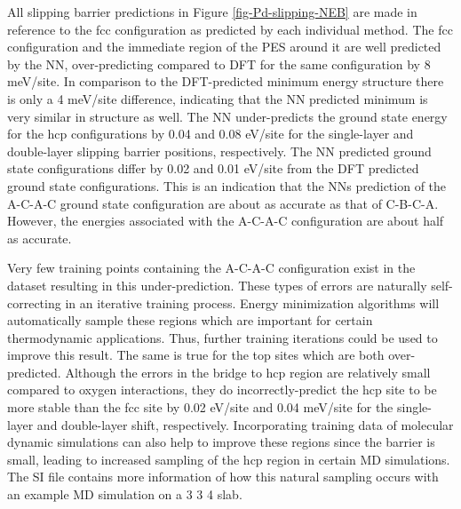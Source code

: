 \documentclass[12pt,oneside]{cmuthesis}
\begin{document}
All slipping barrier predictions in Figure \ref{fig-Pd-slipping-NEB} are made in reference to the fcc configuration as predicted by each individual method. The fcc configuration and the immediate region of the PES around it are well predicted by the NN, over-predicting compared to DFT for the same configuration by 8 meV/site. In comparison to the DFT-predicted minimum energy structure there is only a 4 meV/site difference, indicating that the NN predicted minimum is very similar in structure as well. The NN under-predicts the ground state energy for the hcp configurations by 0.04 and 0.08 eV/site for the single-layer and double-layer slipping barrier positions, respectively. The NN predicted ground state configurations differ by 0.02 and 0.01 eV/site from the DFT predicted ground state configurations. This is an indication that the NNs prediction of the A-C-A-C ground state configuration are about as accurate as that of C-B-C-A. However, the energies associated with the A-C-A-C configuration are about half as accurate.

Very few training points containing the A-C-A-C configuration exist in the dataset resulting in this under-prediction. These types of errors are naturally self-correcting in an iterative training process. Energy minimization algorithms will automatically sample these regions which are important for certain thermodynamic applications. Thus, further training iterations could be used to improve this result. The same is true for the top sites which are both over-predicted. Although the errors in the bridge to hcp region are relatively small compared to oxygen interactions, they do incorrectly-predict the hcp site to be more stable than the fcc site by 0.02 eV/site and 0.04 meV/site for the single-layer and double-layer shift, respectively. Incorporating training data of molecular dynamic simulations can also help to improve these regions since the barrier is small, leading to increased sampling of the hcp region in certain MD simulations. The SI file contains more information of how this natural sampling occurs with an example MD simulation on a 3 \texttimes{} 3 \texttimes{} 4 slab.
\end{document}

